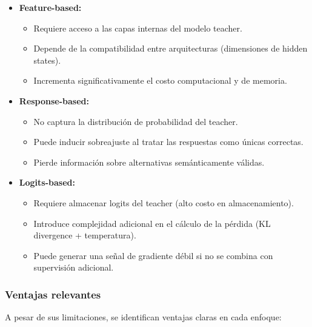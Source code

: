 \documentclass[12pt]{article}
\begin{document}
	\begin{itemize}
		\item \textbf{Feature-based:}
		\begin{itemize}
			\item Requiere acceso a las capas internas del modelo teacher.
			\item Depende de la compatibilidad entre arquitecturas (dimensiones de hidden states).
			\item Incrementa significativamente el costo computacional y de memoria.
		\end{itemize}
		
		\item \textbf{Response-based:}
		\begin{itemize}
			\item No captura la distribución de probabilidad del teacher.
			\item Puede inducir sobreajuste al tratar las respuestas como únicas correctas.
			\item Pierde información sobre alternativas semánticamente válidas.
		\end{itemize}
		
		\item \textbf{Logits-based:}
		\begin{itemize}
			\item Requiere almacenar logits del teacher (alto costo en almacenamiento).
			\item Introduce complejidad adicional en el cálculo de la pérdida (KL divergence + temperatura).
			\item Puede generar una señal de gradiente débil si no se combina con supervisión adicional.
		\end{itemize}
	\end{itemize}
	
	\subsubsection{Ventajas relevantes}
	
	A pesar de sus limitaciones, se identifican ventajas claras en cada enfoque:
	
\end{document}
